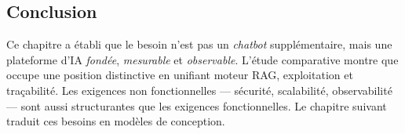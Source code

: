 \subsection{Conclusion}
Ce chapitre a établi que le besoin n'est pas un \emph{chatbot} supplémentaire,
mais une plateforme d'IA \emph{fondée}, \emph{mesurable} et \emph{observable}.
L'étude comparative montre que \devpilot{} occupe une position distinctive en
unifiant moteur RAG, exploitation et traçabilité. Les exigences non fonctionnelles
— sécurité, scalabilité, observabilité — sont aussi structurantes que les
exigences fonctionnelles. Le chapitre suivant traduit ces besoins en modèles de
conception.
